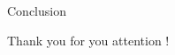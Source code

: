 \begin{frame}{Conclusion}
    
\end{frame}


\begin{frame}[standout]
    Thank you for you attention !
\end{frame}
